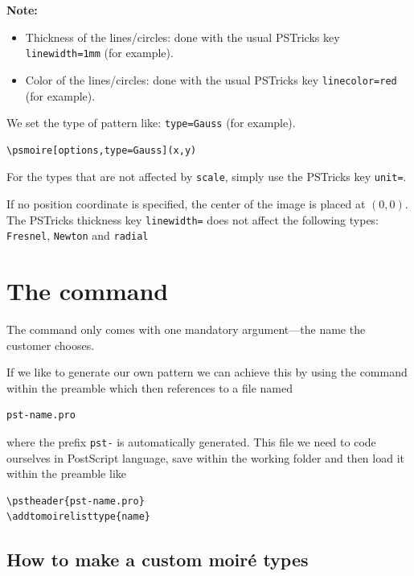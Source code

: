 \documentclass[%
    11pt,
    english,
    BCOR10mm,
    DIV12,
    bibliography=totoc,
    parskip=false,
    fleqn,
    smallheadings,
    headexclude,
    footexclude,
    oneside,
    dvipsnames,
    svgnames,
    x11names
]{pst-doc}
\begin{document}
\textbf{Note:}
\begin{itemize}
  \item Thickness of the lines/circles: done with the usual PSTricks key \verb+linewidth=1mm+ (for example).
  \item Color of the lines/circles: done with the usual PSTricks key \verb+linecolor=red+ (for example).
\end{itemize}
We set the type of pattern like: \texttt{type=Gauss} (for example).
{\small\begin{verbatim}
\psmoire[options,type=Gauss](x,y)
\end{verbatim}}

For the types that are not affected by \texttt{scale}, simply use the PSTricks key \verb+unit=+.

If no position coordinate is specified, the center of the image is placed at $(0,0)$. The PSTricks thickness key \verb+linewidth=+ does not affect the following types:
\verb+Fresnel+, \verb+Newton+ and \verb+radial+


\newpage


\section{The command }

\begin{BDef}
\end{BDef}

The command  only comes with one mandatory argument---the name the customer chooses.

If we like to generate our own pattern we can achieve this by using the command \\
 within the preamble which then references to a file named
\begin{verbatim}
pst-name.pro
\end{verbatim}
where the prefix \verb+pst-+ is automatically generated. This file we need to code ourselves in PostScript language, save within the working folder and then load it within the preamble like
\begin{verbatim}
\pstheader{pst-name.pro}
\addtomoirelisttype{name}
\end{verbatim}


\subsection{How to make a custom moiré types}
\end{document}

